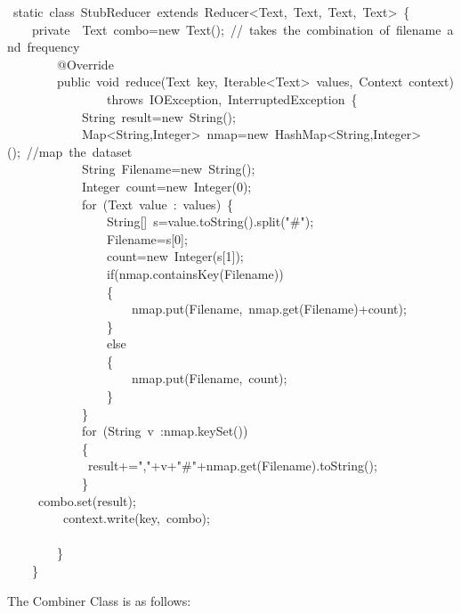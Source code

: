 \documentclass{article}
\begin{document}
\begin{mdpre}%
~{static}~{class}~StubReducer~{extends}~Reducer\textless{}Text,~Text,~Text,~Text\textgreater{}~\{\\
~~~~{private}~~Text~combo={new}~Text();~{//~takes~the~combination~of~filename~and~frequency}\\
~~~~~~~~@Override\\
~~~~~~~~{public}~{void}~reduce(Text~key,~Iterable\textless{}Text\textgreater{}~values,~Context~context)\\
~~~~~~~~~~~~~~~~{throws}~IOException,~InterruptedException~\{\\
~~~~~~~~~~~~String~result={new}~String();\\
~~~~~~~~~~~~Map\textless{}String,Integer\textgreater{}~nmap={new}~HashMap\textless{}String,Integer\textgreater{}();~{//map~the~dataset}\\
~~~~~~~~~~~~String~Filename={new}~String();\\
~~~~~~~~~~~~Integer~count={new}~Integer({0});\\
~~~~~~~~~~~~{for}~(Text~value~:~values)~\{\\
~~~~~~~~~~~~~~~~String{}[]~s=value.{toString}().split({"}{\#}{"});\\
~~~~~~~~~~~~~~~~Filename=s{}[{0}];\\
~~~~~~~~~~~~~~~~count={new}~Integer(s{}[{1}]);\\
~~~~~~~~~~~~~~~~{if}(nmap.containsKey(Filename))\\
~~~~~~~~~~~~~~~~\{\\
~~~~~~~~~~~~~~~~~~~~nmap.put(Filename,~nmap.get(Filename)+count);~~~~~\\
~~~~~~~~~~~~~~~~\}\\
~~~~~~~~~~~~~~~~{else}\\
~~~~~~~~~~~~~~~~\{\\
~~~~~~~~~~~~~~~~~~~~nmap.put(Filename,~count);\\
~~~~~~~~~~~~~~~~\}\\
~~~~~~~~~~~~\}\\
~~~~~~~~~~~~{for}~(String~v~:nmap.keySet())~\\
~~~~~~~~~~~~\{~~~~\\
~~~~~~~~~~~~~result+={"}{,}{"}+v+{"}{\#}{"}+nmap.get(Filename).{toString}();\\
~~~~~~~~~~~~\}\\
~~~~~combo.set(result);\\
~~~~~~~~~context.write(key,~combo);\\
\\
~~~~~~~~\}\\
~~~~\}%
\end{mdpre}\noindent The Combiner Class is as follows:
\end{document}
